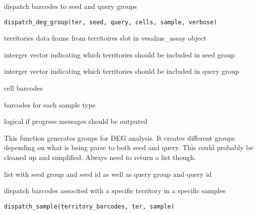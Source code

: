 \documentclass[a4paper]{book}
\begin{document}
%
\begin{Description}
dispatch barcodes to seed and query groups
\end{Description}
%
\begin{Usage}
\begin{verbatim}
dispatch_deg_group(ter, seed, query, cells, sample, verbose)
\end{verbatim}
\end{Usage}
%
\begin{Arguments}
\begin{ldescription}
\item[\code{ter}] territories data frame from territoires slot in
vesalius\_assay object

\item[\code{seed}] interger vector indicating which territories should be included
in seed group

\item[\code{query}] interger vector indicating which territories should be included
in query group

\item[\code{cells}] cell barcodes

\item[\code{sample}] barcodes for each sample type

\item[\code{verbose}] logical if progress messages should be outputed
\end{ldescription}
\end{Arguments}
%
\begin{Details}
This function generates groups for DEG analysis. It creates 
different groups depending on what is being parse to both seed and query. 
This could probably be cleaned up and simplified. Always need to return 
a list though.
\end{Details}
%
\begin{Value}
list with seed group and seed id as well as query group and query id
\end{Value}
%
\begin{Description}
dispatch barcodes associted with a specific territory in a specific samples
\end{Description}
%
\begin{Usage}
\begin{verbatim}
dispatch_sample(territory_barcodes, ter, sample)
\end{verbatim}
\end{Usage}
\end{document}
